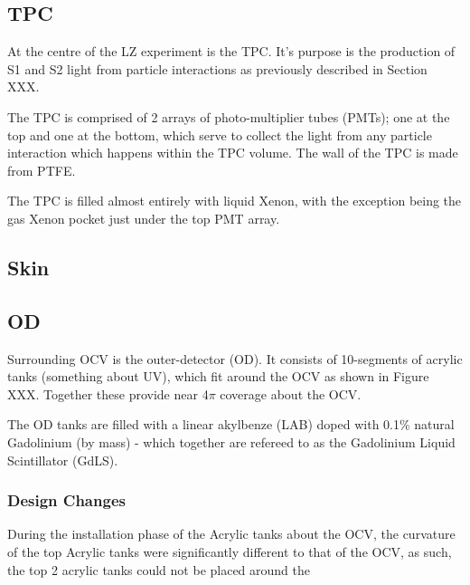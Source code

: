 \subsection{TPC}
\par
At the centre of the LZ experiment is the TPC.
It's purpose is the production of S1 and S2 light from particle interactions as previously described in Section XXX.
\par
The TPC is comprised of 2 arrays of photo-multiplier tubes (PMTs); one at the top and one at the bottom, which serve to collect the light from any particle interaction which happens within the TPC volume.
The wall of the TPC is made from PTFE.
\par
The TPC is filled almost entirely with liquid Xenon, with the exception being the gas Xenon pocket just under the top PMT array.

\subsection{Skin}
\par


\subsection{OD}
\par
Surrounding OCV is the outer-detector (OD).
It consists of 10-segments of acrylic tanks (something about UV), which fit around the OCV as shown in Figure XXX.
Together these provide near 4$\pi$ coverage about the OCV.

\par
The OD tanks are filled with a linear akylbenze (LAB) doped with 0.1\% natural Gadolinium (by mass) - which together are refereed to as the Gadolinium Liquid Scintillator (GdLS).



\par



\subsubsection{Design Changes}
\par
During the installation phase of the Acrylic tanks about the OCV, the curvature of the top Acrylic tanks were significantly different to that of the OCV, as such, the top 2 acrylic tanks could not be placed around the 

\par


